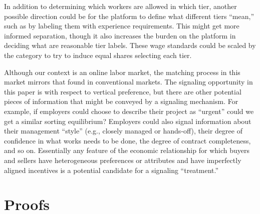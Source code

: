 \documentclass[12pt]{article}
\begin{document}
In addition to determining which workers are allowed in which tier, another possible direction could be for the platform to define what different tiers ``mean,'' such as by labeling them with experience requirements.
This might get more informed separation, though it also increases the burden on the platform in deciding what are reasonable tier labels. 
These wage standards could be scaled by the category to try to induce equal shares selecting each tier.

Although our context is an online labor market, the matching process in this market mirrors that found in conventional markets. 
The signaling opportunity in this paper is with respect to vertical preference, but there are other potential pieces of information that might be conveyed by a signaling mechanism. 
For example, if employers could choose to describe their project as ``urgent'' could we get a similar sorting equilibrium? 
Employers could also signal information about their management ``style'' (e.g., closely managed or hands-off),  their degree of confidence in what works needs to be done, the degree of contract completeness, and so on.  
Essentially any feature of the economic relationship for which buyers and sellers have heterogeneous preferences or attributes and have imperfectly aligned incentives is a potential candidate for a signaling ``treatment.'' 




\newpage

\appendix

\section{Proofs} \label{sec:proofs}
\end{document}

